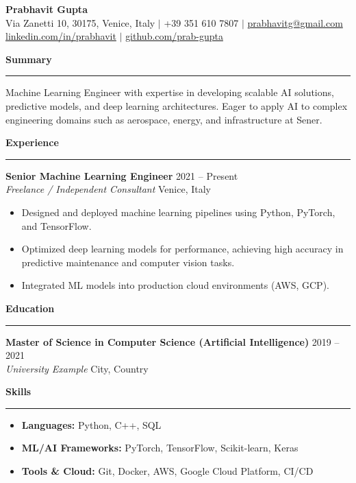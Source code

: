 \documentclass[10pt,a4paper]{article}
\begin{document}
\begin{center}
    {\Huge \textbf{Prabhavit Gupta}} \\ \vspace{2mm}
    Via Zanetti 10, 30175, Venice, Italy $\vert$ +39 351 610 7807 $\vert$ \href{mailto:prabhavitg@gmail.com}{prabhavitg@gmail.com} \\
    \href{https://www.linkedin.com/in/prabhavit/}{linkedin.com/in/prabhavit} $\vert$ \href{https://github.com/prab-gupta}{github.com/prab-gupta}
\end{center}

\vspace{5mm}

\noindent\textbf{\Large Summary} \\
\hrule
\vspace{2mm}
Machine Learning Engineer with expertise in developing scalable AI solutions, predictive models, and deep learning architectures. Eager to apply AI to complex engineering domains such as aerospace, energy, and infrastructure at Sener.

\vspace{5mm}
\noindent\textbf{\Large Experience} \\
\hrule
\vspace{2mm}
\textbf{Senior Machine Learning Engineer} \hfill 2021 -- Present \\
\textit{Freelance / Independent Consultant} \hfill Venice, Italy
\begin{itemize}
    \item Designed and deployed machine learning pipelines using Python, PyTorch, and TensorFlow.
    \item Optimized deep learning models for performance, achieving high accuracy in predictive maintenance and computer vision tasks.
    \item Integrated ML models into production cloud environments (AWS, GCP).
\end{itemize}

\vspace{5mm}
\noindent\textbf{\Large Education} \\
\hrule
\vspace{2mm}
\textbf{Master of Science in Computer Science (Artificial Intelligence)} \hfill 2019 -- 2021 \\
\textit{University Example} \hfill City, Country

\vspace{5mm}
\noindent\textbf{\Large Skills} \\
\hrule
\vspace{2mm}
\begin{itemize}
    \item \textbf{Languages:} Python, C++, SQL
    \item \textbf{ML/AI Frameworks:} PyTorch, TensorFlow, Scikit-learn, Keras
    \item \textbf{Tools \& Cloud:} Git, Docker, AWS, Google Cloud Platform, CI/CD
\end{itemize}
\end{document}
